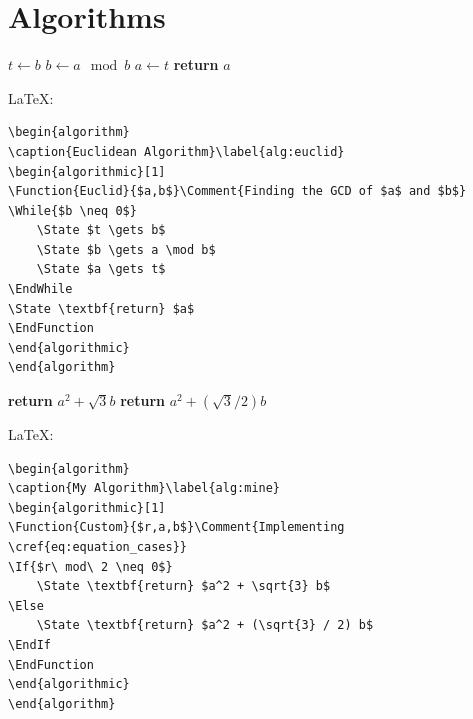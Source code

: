 \documentclass[12pt,nonacm,acmlarge,titlepage,screen]{acmart}
\begin{document}
\section*{Algorithms}

\begin{algorithm}
\caption{Euclidean Algorithm}\label{alg:euclid}
\begin{algorithmic}[1]
    \State $t \gets b$
    \State $b \gets a \mod b$
    \State $a \gets t$
\EndWhile
\State \textbf{return} $a$
\EndFunction
\end{algorithmic}
\end{algorithm}

\noindent\LaTeX:
\begin{Verbatim}[frame=single]
\begin{algorithm}
\caption{Euclidean Algorithm}\label{alg:euclid}
\begin{algorithmic}[1]
\Function{Euclid}{$a,b$}\Comment{Finding the GCD of $a$ and $b$}
\While{$b \neq 0$}
    \State $t \gets b$
    \State $b \gets a \mod b$
    \State $a \gets t$
\EndWhile
\State \textbf{return} $a$
\EndFunction
\end{algorithmic}
\end{algorithm}
\end{Verbatim}

\begin{algorithm}
\caption{My Algorithm}\label{alg:mine}
\begin{algorithmic}[1]
    \State \textbf{return} $a^2 + \sqrt{3} b$
\Else
    \State \textbf{return} $a^2 + (\sqrt{3} / 2) b$
\EndIf
\EndFunction
\end{algorithmic}
\end{algorithm}

\noindent\LaTeX:
\begin{Verbatim}[frame=single]
\begin{algorithm}
\caption{My Algorithm}\label{alg:mine}
\begin{algorithmic}[1]
\Function{Custom}{$r,a,b$}\Comment{Implementing \cref{eq:equation_cases}}
\If{$r\ mod\ 2 \neq 0$}
    \State \textbf{return} $a^2 + \sqrt{3} b$
\Else
    \State \textbf{return} $a^2 + (\sqrt{3} / 2) b$
\EndIf
\EndFunction
\end{algorithmic}
\end{algorithm}
\end{Verbatim}
\end{document}
